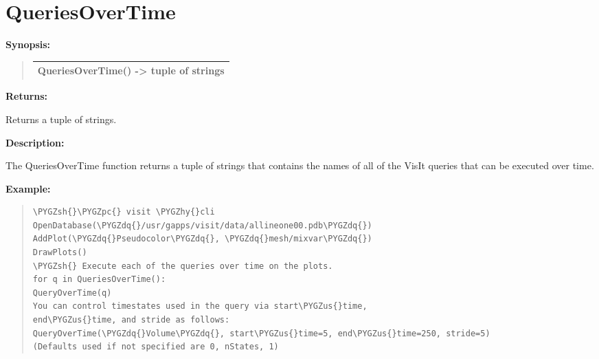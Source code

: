\documentclass[letterpaper,10pt,english]{sphinxmanual}
\def\PYGZus{\char`\_}
\def\PYGZsh{\char`\#}
\def\PYGZpc{\char`\%}
\def\PYGZhy{\char`\-}
\def\PYGZdq{\char`\"}
\begin{document}
\section{QueriesOverTime}
\label{functions:queriesovertime}
\begin{DUlineblock}{0em}
\item[] \textbf{Synopsis:}
\end{DUlineblock}
\begin{quote}

\begin{tabulary}{\linewidth}{|L|}
\hline

QueriesOverTime() -\textgreater{} tuple of strings
\\
\hline\end{tabulary}

\end{quote}

\begin{DUlineblock}{0em}
\item[] 
\item[] \textbf{Returns:}
\item[] Returns a tuple of strings.
\item[] 
\item[] \textbf{Description:}
\item[] The QueriesOverTime function returns a tuple of strings that contains the
names of all of the VisIt queries that can be executed over time.
\end{DUlineblock}

\begin{DUlineblock}{0em}
\item[] 
\end{DUlineblock}

\begin{DUlineblock}{0em}
\item[] \textbf{Example:}
\item[] 
\end{DUlineblock}
\begin{quote}

\begin{Verbatim}[commandchars=\\\{\}]
\PYGZsh{}\PYGZpc{} visit \PYGZhy{}cli
OpenDatabase(\PYGZdq{}/usr/gapps/visit/data/allineone00.pdb\PYGZdq{})
AddPlot(\PYGZdq{}Pseudocolor\PYGZdq{}, \PYGZdq{}mesh/mixvar\PYGZdq{})
DrawPlots()
\PYGZsh{} Execute each of the queries over time on the plots.
for q in QueriesOverTime():
QueryOverTime(q)
You can control timestates used in the query via start\PYGZus{}time,
end\PYGZus{}time, and stride as follows:
QueryOverTime(\PYGZdq{}Volume\PYGZdq{}, start\PYGZus{}time=5, end\PYGZus{}time=250, stride=5)
(Defaults used if not specified are 0, nStates, 1)
\end{Verbatim}
\end{quote}
\end{document}
